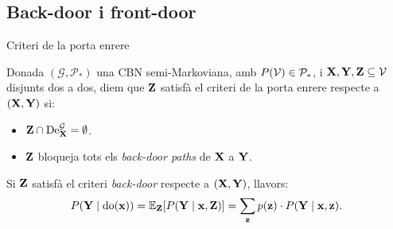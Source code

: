 \documentclass{bestbeamer}
\begin{document}
\subsection{Back-door i front-door}
\begin{frame}{Criteri de la porta enrere}
\begin{definition}\label{def:back-door}
Donada $(\mathcal{G},\mathcal{P}_*)$ una CBN semi-Markoviana, amb $P(\mathcal{V})\in\mathcal{P}_*$, i $\mathbf{X},\mathbf{Y},\mathbf{Z}\subseteq \mathcal{V}$ disjunts dos a dos, diem que $\mathbf{Z}$ satisfà el criteri de la porta enrere respecte a $(\mathbf{X},\mathbf{Y})$ si:
\begin{itemize}
    \item $\mathbf{Z}\cap \operatorname{De}_{\mathbf{X}}^{\mathcal{G}}=\emptyset$.
    \item $\mathbf{Z}$ bloqueja tots els \textit{back-door paths} de $\mathbf{X}$ a $\mathbf{Y}$. 
\end{itemize}
\end{definition}
\begin{theorem}\label{thm:back-door}
Si $\mathbf{Z}$ satisfà el criteri \textit{back-door} respecte a $(\mathbf{X},\mathbf{Y})$, llavors:
\begin{equation*}
    P(\mathbf{Y}\mid \operatorname{do}(\mathbf{x})) = \mathbb{E}_{\mathbf{Z}}[P(\mathbf{Y} \mid \mathbf{x}, \mathbf{Z})]=\sum_{\mathbf{z}} p(\mathbf{z})\cdot P(\mathbf{Y} \mid \mathbf{x}, \mathbf{z}).
\end{equation*}
\end{theorem}
\end{frame}
\end{document}
